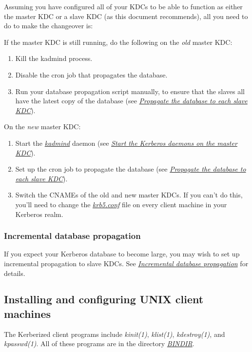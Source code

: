 \documentclass[letterpaper,10pt,english]{sphinxmanual}
\begin{document}
Assuming you have configured all of your KDCs to be able to function
as either the master KDC or a slave KDC (as this document recommends),
all you need to do to make the changeover is:

If the master KDC is still running, do the following on the \emph{old}
master KDC:
\begin{enumerate}
\item {} 
Kill the kadmind process.

\item {} 
Disable the cron job that propagates the database.

\item {} 
Run your database propagation script manually, to ensure that the
slaves all have the latest copy of the database (see
{\hyperref[admin/install_kdc:kprop-to-slaves]{\emph{Propagate the database to each slave KDC}}}).

\end{enumerate}

On the \emph{new} master KDC:
\begin{enumerate}
\item {} 
Start the {\hyperref[admin/admin_commands/kadmind:kadmind-8]{\emph{kadmind}}} daemon (see {\hyperref[admin/install_kdc:start-kdc-daemons]{\emph{Start the Kerberos daemons on the master KDC}}}).

\item {} 
Set up the cron job to propagate the database (see
{\hyperref[admin/install_kdc:kprop-to-slaves]{\emph{Propagate the database to each slave KDC}}}).

\item {} 
Switch the CNAMEs of the old and new master KDCs.  If you can't do
this, you'll need to change the {\hyperref[admin/conf_files/krb5_conf:krb5-conf-5]{\emph{krb5.conf}}} file on every
client machine in your Kerberos realm.

\end{enumerate}


\subsubsection{Incremental database propagation}
\label{admin/install_kdc:incremental-database-propagation}
If you expect your Kerberos database to become large, you may wish to
set up incremental propagation to slave KDCs.  See {\hyperref[admin/database:incr-db-prop]{\emph{Incremental database propagation}}}
for details.


\subsection{Installing and configuring UNIX client machines}
\label{admin/install_clients:installing-and-configuring-unix-client-machines}\label{admin/install_clients::doc}
The Kerberized client programs include \emph{kinit(1)},
\emph{klist(1)}, \emph{kdestroy(1)}, and \emph{kpasswd(1)}.  All of
these programs are in the directory {\hyperref[mitK5defaults:paths]{\emph{BINDIR}}}.
\end{document}
